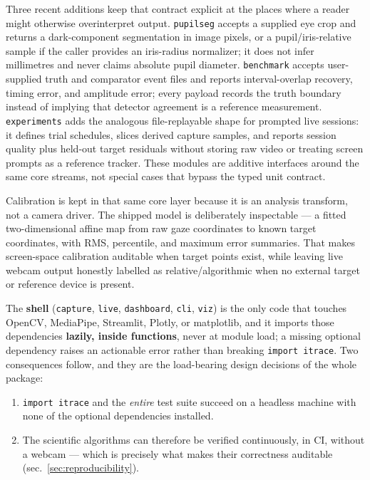 \documentclass[
]{article}
\providecommand{\tightlist}{%
  \setlength{\itemsep}{0pt}\setlength{\parskip}{0pt}}
\begin{document}
Three recent additions keep that contract explicit at the places where a
reader might otherwise overinterpret output. \texttt{pupilseg} accepts a
supplied eye crop and returns a dark-component segmentation in image
pixels, or a pupil/iris-relative sample if the caller provides an
iris-radius normalizer; it does not infer millimetres and never claims
absolute pupil diameter. \texttt{benchmark} accepts user-supplied truth
and comparator event files and reports interval-overlap recovery, timing
error, and amplitude error; every payload records the truth boundary
instead of implying that detector agreement is a reference measurement.
\texttt{experiments} adds the analogous file-replayable shape for
prompted live sessions: it defines trial schedules, slices derived
capture samples, and reports session quality plus held-out target
residuals without storing raw video or treating screen prompts as a
reference tracker. These modules are additive interfaces around the same
core streams, not special cases that bypass the typed unit contract.

Calibration is kept in that same core layer because it is an analysis
transform, not a camera driver. The shipped model is deliberately
inspectable --- a fitted two-dimensional affine map from raw gaze
coordinates to known target coordinates, with RMS, percentile, and
maximum error summaries. That makes screen-space calibration auditable
when target points exist, while leaving live webcam output honestly
labelled as relative/algorithmic when no external target or reference
device is present.

The \textbf{shell} (\texttt{capture}, \texttt{live}, \texttt{dashboard},
\texttt{cli}, \texttt{viz}) is the only code that touches OpenCV,
MediaPipe, Streamlit, Plotly, or matplotlib, and it imports those
dependencies \textbf{lazily, inside functions}, never at module load; a
missing optional dependency raises an actionable error rather than
breaking \texttt{import\ itrace}. Two consequences follow, and they are
the load-bearing design decisions of the whole package:

\begin{enumerate}
\def\labelenumi{\arabic{enumi}.}
\tightlist
\item
  \texttt{import\ itrace} and the \emph{entire} test suite succeed on a
  headless machine with none of the optional dependencies installed.
\item
  The scientific algorithms can therefore be verified continuously, in
  CI, without a webcam --- which is precisely what makes their
  correctness auditable (sec.~\ref{sec:reproducibility}).
\end{enumerate}
\end{document}
